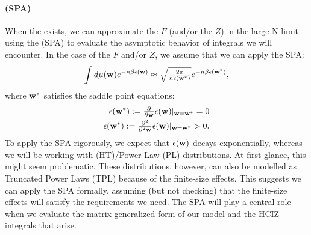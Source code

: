 {\paragraph{\SaddlePointApproximation (SPA)}
When the \ThermodynamicLimit exists, 
we can approximate the  \FreeEnergy $F$ 
(and/or the \PartitionFunction $Z$) in the large-N limit
using the \SaddlePointApproximation (SPA) to evaluate the asymptotic behavior of 
integrals we will encounter.
In the case of the $F$ and/or $Z$, we assume that we can apply the SPA:
\begin{align}
  \label{eqn:SPA}
  \int d\mu({\mathbf{w}}) e^{-n\beta\epsilon({\mathbf{w}})}\approx \sqrt{\tfrac{2\pi}{n\epsilon({\mathbf{w}}^{*})}} e^{-n\beta\epsilon({\mathbf{w}}^{*})}  ,
\end{align}
where ${\mathbf{w}}^{*}$ satisfies the saddle point equations:
\begin{align}
  \epsilon({\mathbf{w}}^{*}):=\tfrac{\partial}{\partial {\mathbf{w}}}\epsilon({\mathbf{w}})\vert_{{\mathbf{w}}={\mathbf{w}}^{*}}=0 \\
  \epsilon({\mathbf{w}}^{*}):=\tfrac{\partial^{2}}{\partial^{2} {\mathbf{w}}}\epsilon({\mathbf{w}})\vert_{{\mathbf{w}}={\mathbf{w}}^{*}}>0  .
\end{align}
To apply the SPA rigorously, we expect that $\epsilon({\mathbf{w}})$ decays exponentially,
whereas we will be working with \HeavyTailed (HT)/Power-Law (PL) distributions.
At first glance, this might seem problematic.
These distributions, however, can also be modelled as Truncated Power Laws (TPL) because of the finite-size effects. 
This suggests we can apply the SPA formally, assuming (but not checking) that the finite-size effects will satisfy the requirements we need.
The SPA will play a central role when we evaluate the matrix-generalized form of our model and the HCIZ integrals that arise.

}
